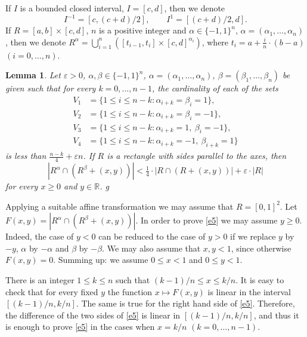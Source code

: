 \documentclass[12pt]{article}
\newtheorem{lemma}[theorem]{Lemma}
\def\rr{{\mathbb R}}
\def\al{\alpha}
\def\be{\beta}
\def\ep{\varepsilon}
\def\cd{\cdot}
\def\stb{,\ldots ,}
\def\nl{[0,1]}
\def\proof{\noindent {\bf Proof.} }
\begin{document}
If $I$ is a bounded closed interval, $I=[c,d]$, then we denote
$$I^{-1}=[c,(c+d)/2], \qquad I^{1}=[(c+d)/2 ,d].$$
If $R=[a,b]\times [c,d]$, $n$ is a positive integer and $\al \in \{ -1,1\} ^n$,
$\al = (\al _1 \stb \al _n )$, then we denote $R^\al =\bigcup_{i=1}^n ([t_{i-1},
t_i ]\times [c,d]^{\al _i} )$, where $t_i =a+\tfrac{i}{n} \cd (b-a)$
$(i=0\stb n)$.
\begin{lemma} \label{l7}
Let $\ep >0$, $\al , \be \in \{ -1,1\} ^n$, $\al = (\al _1 \stb \al _n )$,
$\be = (\be _1 \stb \be _n )$ be given such that for every $k=0\stb n-1$, the
cardinality of each of the sets
\begin{equation}\label{e4b}
\begin{split}  
V_1 &=\{ 1\le i\le n-k \colon \al _{i+k} =\be _i =1\} ,\\
V_2 &=\{ 1\le i\le n-k \colon \al _{i+k} =\be _i =-1\} ,\\
V_3 &=\{ 1\le i\le n-k \colon \al _{i+k} =1, \ \be _i =-1\} ,\\
V_4 &=\{ 1\le i\le n-k \colon \al _{i+k} =-1, \ \be_{i+k} =1\}
\end{split}
\end{equation}
is less than $\tfrac{n-k}{4} +\ep n$. If $R$ is a rectangle with sides parallel
to the axes, then 
\begin{equation} \label{e5}
  |R^\al \cap (R^\be +(x,y)) |< \tfrac{1}{4}\cd |R\cap (R+(x,y))|+\ep \cd |R|
\end{equation}
for every $x\ge 0$ and $y\in \rr$.
g\end{lemma}
\proof  Applying a suitable affine transformation we may assume that $R=\nl ^2$.
Let $F(x,y)=|R^\al \cap (R^\be +(x,y))|$. In order to prove \eqref{e5} we may
assume $y\ge 0$. Indeed, the case of $y<0$ can be reduced to the case
of $y>0$ if we replace $y$ by $-y$, $\al$ by $-\al$ and $\be$ by $-\be$. We
may also assume that $x,y<1$, since otherwise $F(x,y)=0$. Summing up: we
assume $0\le x<1$ and $0\le y<1$.

There is an integer $1\le k\le n$ such that $(k-1)/n\le x \le k/n$.
It is easy to check that for every fixed $y$ the function $x\mapsto F(x,y)$
is linear in the interval $[(k-1)/n,k/n]$. The same is true for the right hand
side of \eqref{e5}. Therefore, the difference of the two sides of \eqref{e5}
is linear in $[(k-1)/n,k/n]$, and thus it is enough to prove \eqref{e5} in
the cases when $x=k/n$ $(k=0\stb n-1)$.
\end{document}
